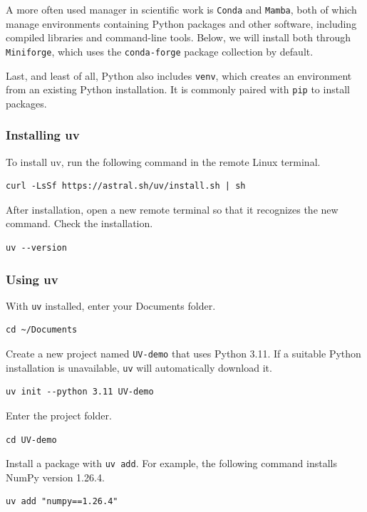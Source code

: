 \documentclass[12pt]{article}
\newcommand{\program}[1]{\begingroup\setlength{\fboxsep}{2pt}%
  \colorbox{ProgramBackground}{\texttt{#1}}\endgroup}
\newcommand{\inlinecode}[1]{\begingroup\setlength{\fboxsep}{2pt}%
  \colorbox{black!5}{\texttt{#1}}\endgroup}
\begin{document}
A more often used manager in scientific work is \program{Conda} and \program{Mamba}, both of which manage environments containing Python packages and other software, including compiled libraries and command-line tools. Below, we will install both through \program{Miniforge}, which uses the \program{conda-forge} package collection by default.

Last, and least of all, Python also includes \program{venv}, which creates an environment from an existing Python installation. It is commonly paired with \program{pip} to install packages.

\subsubsection*{Installing uv}
To install uv, run the following command in the remote Linux terminal.
\begin{lstlisting}
curl -LsSf https://astral.sh/uv/install.sh | sh
\end{lstlisting}

After installation, open a new remote terminal so that it recognizes the new command. Check the installation.
\begin{lstlisting}
uv --version
\end{lstlisting}

\subsubsection*{Using uv}

With \program{uv} installed, enter your Documents folder.
\begin{lstlisting}
cd ~/Documents
\end{lstlisting}

Create a new project named \inlinecode{UV-demo} that uses Python 3.11. If a suitable Python installation is unavailable, \program{uv} will automatically download it.
\begin{lstlisting}
uv init --python 3.11 UV-demo
\end{lstlisting}

Enter the project folder.
\begin{lstlisting}
cd UV-demo
\end{lstlisting}

Install a package with \inlinecode{uv add}. For example, the following command installs NumPy version 1.26.4.
\begin{lstlisting}
uv add "numpy==1.26.4"
\end{lstlisting}
\end{document}
